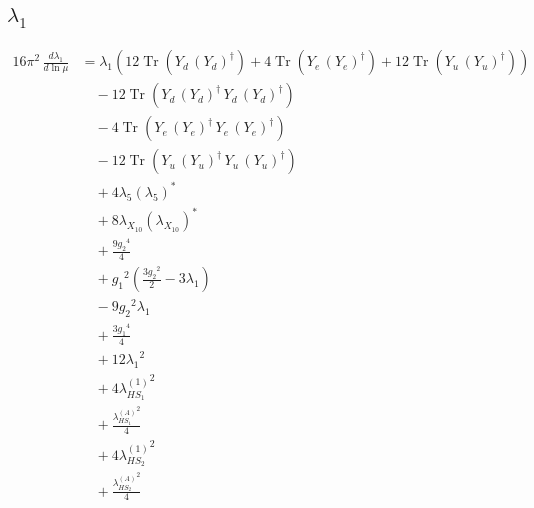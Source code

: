 \documentclass[10pt,a4paper]{article}
\begin{document}
\subsection*{$\lambda_1$}
\begin{align*}
16\pi^2\,\frac{d \lambda_1}{d\ln\mu} &={\lambda_1} (12 \operatorname{Tr}\!\left({Y_d}\,\left({Y_d}\right)^{\dagger}\right)+4 \operatorname{Tr}\!\left({Y_e}\,\left({Y_e}\right)^{\dagger}\right)+12 \operatorname{Tr}\!\left({Y_u}\,\left({Y_u}\right)^{\dagger}\right)) \\
&\quad -12 \operatorname{Tr}\!\left({Y_d}\,\left({Y_d}\right)^{\dagger}\,{Y_d}\,\left({Y_d}\right)^{\dagger}\right) \\
&\quad -4 \operatorname{Tr}\!\left({Y_e}\,\left({Y_e}\right)^{\dagger}\,{Y_e}\,\left({Y_e}\right)^{\dagger}\right) \\
&\quad -12 \operatorname{Tr}\!\left({Y_u}\,\left({Y_u}\right)^{\dagger}\,{Y_u}\,\left({Y_u}\right)^{\dagger}\right) \\
&\quad +4 {\lambda_5} \left({\lambda_5}\right)^{*} \\
&\quad +8 {\lambda_{X_{10}}} \left({\lambda_{X_{10}}}\right)^{*} \\
&\quad +\frac{9 {g_2}^4}{4} \\
&\quad +{g_1}^2 \left(\frac{3 {g_2}^2}{2}-3 {\lambda_1}\right) \\
&\quad -9 {g_2}^2 {\lambda_1} \\
&\quad +\frac{3 {g_1}^4}{4} \\
&\quad +12 {\lambda_1}^2 \\
&\quad +4 {\lambda_{HS_1}^{(1)}}^2 \\
&\quad +\frac{{\lambda_{HS_1}^{(A)}}^2}{4} \\
&\quad +4 {\lambda_{HS_2}^{(1)}}^2 \\
&\quad +\frac{{\lambda_{HS_2}^{(A)}}^2}{4} \\
\end{align*}
\end{document}
